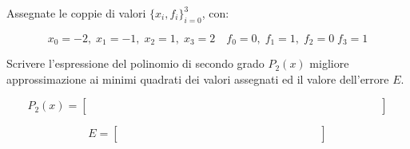 Assegnate le coppie di valori $\{x_i,f_i \}_{i=0}^3$, con:

\[ x_0=-2, \; x_1=-1, \; x_2=1, \; x_3=2 \quad f_0=0, \; f_1=1, \; f_2=0 \; f_3=1 \]

\noindent Scrivere l'espressione del polinomio di secondo grado 
$P_2(x)$ migliore approssimazione ai minimi quadrati dei valori 
assegnati ed il valore dell'errore $E$.

\[
P_2(x)=\left [
\begin{array}{cccccccccccccc}
\quad &  \quad & \quad &  \quad &  \quad &  \quad &  \quad  \quad & \quad &  \quad & \quad &  \quad & \quad & \quad &  \quad  \\
\quad &  \quad & \quad &  \quad &  \quad &  \quad &  \quad  \quad & \quad &  \quad & \quad &  \quad & \quad & \quad &  \quad \\
\quad &  \quad & \quad &  \quad &  \quad &  \quad &  \quad  \quad 
& \quad &  \quad & \quad &  \quad & \quad & \quad &  \quad
\end{array}\right]
\]
\medskip

\[
E=\left [
\begin{array}{cccccccccccccc}
\quad &  \quad & \quad &  \quad & \quad &  \quad & \quad &  \quad & \quad & \quad  \\
\quad &  \quad & \quad &  \quad & \quad &  \quad & \quad &  \quad & \quad & \quad \\
\quad &  \quad & \quad &  \quad  & \quad &  \quad & \quad  & \quad 
& \quad &  \quad
\end{array}\right]
\]
